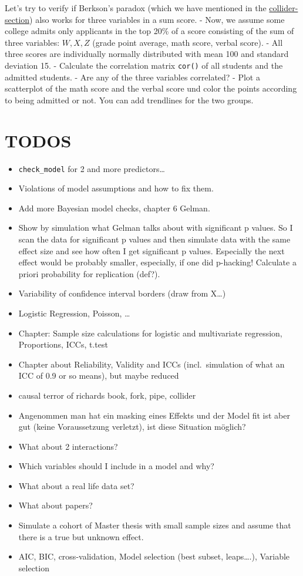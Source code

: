 \documentclass[
]{book}
\providecommand{\tightlist}{%
  \setlength{\itemsep}{0pt}\setlength{\parskip}{0pt}}
\begin{document}
Let's try to verify if Berkson's paradox (which we have mentioned in the
\hyperref[collider]{collider-section}) also works for three variables in a sum score.
- Now, we assume some college admits only applicants in the top 20\% of a score
consisting of the sum of three variables: \(W, X, Z\) (grade point average, math score, verbal score).
- All three scores are individually normally distributed with mean 100 and standard deviation 15.
- Calculate the correlation matrix \texttt{cor()} of all students and the admitted students.
- Are any of the three variables correlated?
- Plot a scatterplot of the math score and the verbal score und color the points according
to being admitted or not. You can add trendlines for the two groups.

\section{TODOS}\label{todos}

\begin{itemize}
\tightlist
\item
  \texttt{check\_model} for 2 and more predictors\ldots{}
\item
  Violations of model assumptions and how to fix them.
\item
  Add more Bayesian model checks, chapter 6 Gelman.
\item
  Show by simulation what Gelman talks about with significant p values. So I scan the data
  for significant p values and then simulate data with the same effect size and see how often
  I get significant p values. Especially the next effect would be probably smaller,
  especially, if one did p-hacking! Calculate a priori probability for replication (def?).
\item
  Variability of confidence interval borders (draw from X\ldots)
\item
  Logistic Regression, Poisson, \ldots{}
\item
  Chapter: Sample size calculations for logistic and multivariate regression, Proportions, ICCs, t.test
\item
  Chapter about Reliability, Validity and ICCs (incl.~simulation of what an ICC of 0.9 or so means), but maybe reduced
\item
  causal terror of richards book, fork, pipe, collider
\item
  Angenommen man hat ein masking eines Effekts und der Model fit ist aber gut (keine Voraussetzung verletzt),
  ist diese Situation möglich?
\item
  What about 2 interactions?
\item
  Which variables should I include in a model and why?
\item
  What about a real life data set?
\item
  What about papers?
\item
  Simulate a cohort of Master thesis with small sample sizes and assume
  that there is a true but unknown effect.
\item
  AIC, BIC, cross-validation, Model selection (best subset, leaps\ldots.), Variable selection
\end{itemize}


\end{document}
